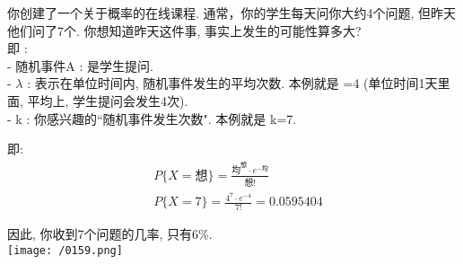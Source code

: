 \documentclass[UTF8]{ctexart}
\begin{document}
	
	\begin{myEnvSample}
		你创建了一个关于概率的在线课程. 通常，你的学生每天问你大约4个问题, 但昨天他们问了7个. 你想知道昨天这件事, 事实上发生的可能性算多大? \\
		即 : \\
		- 随机事件A : 是学生提问. \\
		- $\lambda$ : 表示在单位时间内, 随机事件发生的平均次数. 本例就是 =4 (单位时间1天里面, 平均上, 学生提问会发生4次). \\
		- k : 你感兴趣的``随机事件发生次数". 本例就是 k=7. 
		
		即: 
		\begin{align*}  %
	&P\{X=\text{想\}}=\frac{\text{均}^{\text{想}}\cdot e^{-\text{均}}}{\text{想!}}\\
&P\{X=7\}=\frac{4^7\cdot e^{-4}}{7!}=0.0595404
		\end{align*}
	
	因此, 你收到7个问题的几率, 只有6\%. \\
	
	\texttt{[image: /0159.png]} 
	\end{myEnvSample}
	\vspace{1em} 
	
	
	
	
	
\end{document}
